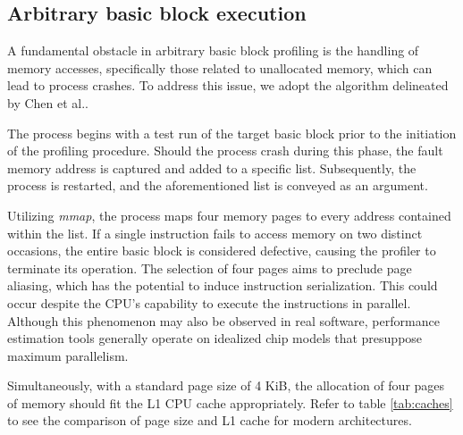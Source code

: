 \subsection{Arbitrary basic block execution}

A fundamental obstacle in arbitrary basic block profiling is the handling of memory accesses, specifically 
those related to unallocated memory, which can lead to process crashes. To address this issue, we adopt 
the algorithm delineated by Chen et al.\cite{chenBHiveBenchmarkSuite2019}.

The process begins with a test run of the target basic block prior to the initiation of the profiling 
procedure. Should the process crash during this phase, the fault memory address is captured and added to 
a specific list. Subsequently, the process is restarted, and the aforementioned list is conveyed as an 
argument.

Utilizing \textit{mmap}, the process maps four memory pages to every address contained within the list. 
If a single instruction fails to access memory on two distinct occasions, the entire basic block is 
considered defective, causing the profiler to terminate its operation. The selection of four pages aims 
to preclude page aliasing, which has the potential to induce instruction serialization. This could occur 
despite the CPU's capability to execute the instructions in parallel. Although this phenomenon may also 
be observed in real software, performance estimation tools generally operate on idealized chip models 
that presuppose maximum parallelism.

Simultaneously, with a standard page size of 4 KiB, the allocation of four pages of memory should fit 
the L1 CPU cache appropriately. Refer to table \ref{tab:caches} to see the comparison of page size and 
L1 cache for modern architectures.

